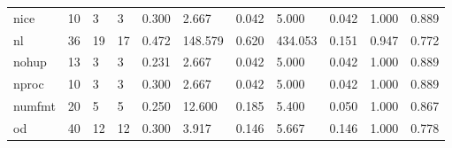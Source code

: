 \begin{longtable}{lp{1.2cm}p{1.2cm}p{1.2cm}p{1.2cm}p{1.2cm}p{1.2cm}p{1.2cm}p{1.2cm}p{1.2cm}p{1.2cm}}
nice      &                           10 &                  3 &                                 3 &                                      0.300 &                                  2.667 &                                        0.042 &                             5.000 &                                   0.042 &                              1.000 &                                              0.889 \\
nl        &                           36 &                 19 &                                17 &                                      0.472 &                                148.579 &                                        0.620 &                           434.053 &                                   0.151 &                              0.947 &                                              0.772 \\
nohup     &                           13 &                  3 &                                 3 &                                      0.231 &                                  2.667 &                                        0.042 &                             5.000 &                                   0.042 &                              1.000 &                                              0.889 \\
nproc     &                           10 &                  3 &                                 3 &                                      0.300 &                                  2.667 &                                        0.042 &                             5.000 &                                   0.042 &                              1.000 &                                              0.889 \\
numfmt    &                           20 &                  5 &                                 5 &                                      0.250 &                                 12.600 &                                        0.185 &                             5.400 &                                   0.050 &                              1.000 &                                              0.867 \\
od        &                           40 &                 12 &                                12 &                                      0.300 &                                  3.917 &                                        0.146 &                             5.667 &                                   0.146 &                              1.000 &                                              0.778 \\

\end{longtable}
